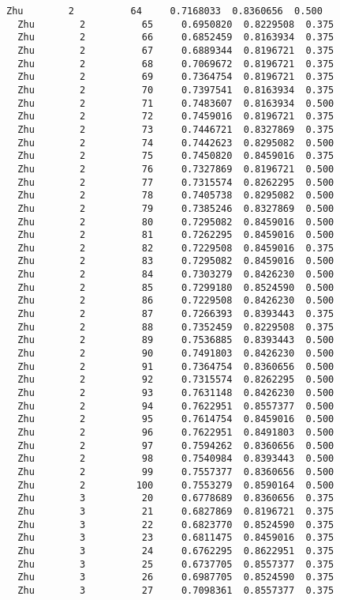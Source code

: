 \documentclass[11pt]{article}
\begin{document}
\begin{Verbatim}[commandchars=\\\{\}]
  Zhu        2          64     0.7168033  0.8360656  0.500
  Zhu        2          65     0.6950820  0.8229508  0.375
  Zhu        2          66     0.6852459  0.8163934  0.375
  Zhu        2          67     0.6889344  0.8196721  0.375
  Zhu        2          68     0.7069672  0.8196721  0.375
  Zhu        2          69     0.7364754  0.8196721  0.375
  Zhu        2          70     0.7397541  0.8163934  0.375
  Zhu        2          71     0.7483607  0.8163934  0.500
  Zhu        2          72     0.7459016  0.8196721  0.375
  Zhu        2          73     0.7446721  0.8327869  0.375
  Zhu        2          74     0.7442623  0.8295082  0.500
  Zhu        2          75     0.7450820  0.8459016  0.375
  Zhu        2          76     0.7327869  0.8196721  0.500
  Zhu        2          77     0.7315574  0.8262295  0.500
  Zhu        2          78     0.7405738  0.8295082  0.500
  Zhu        2          79     0.7385246  0.8327869  0.500
  Zhu        2          80     0.7295082  0.8459016  0.500
  Zhu        2          81     0.7262295  0.8459016  0.500
  Zhu        2          82     0.7229508  0.8459016  0.375
  Zhu        2          83     0.7295082  0.8459016  0.500
  Zhu        2          84     0.7303279  0.8426230  0.500
  Zhu        2          85     0.7299180  0.8524590  0.500
  Zhu        2          86     0.7229508  0.8426230  0.500
  Zhu        2          87     0.7266393  0.8393443  0.375
  Zhu        2          88     0.7352459  0.8229508  0.375
  Zhu        2          89     0.7536885  0.8393443  0.500
  Zhu        2          90     0.7491803  0.8426230  0.500
  Zhu        2          91     0.7364754  0.8360656  0.500
  Zhu        2          92     0.7315574  0.8262295  0.500
  Zhu        2          93     0.7631148  0.8426230  0.500
  Zhu        2          94     0.7622951  0.8557377  0.500
  Zhu        2          95     0.7614754  0.8459016  0.500
  Zhu        2          96     0.7622951  0.8491803  0.500
  Zhu        2          97     0.7594262  0.8360656  0.500
  Zhu        2          98     0.7540984  0.8393443  0.500
  Zhu        2          99     0.7557377  0.8360656  0.500
  Zhu        2         100     0.7553279  0.8590164  0.500
  Zhu        3          20     0.6778689  0.8360656  0.375
  Zhu        3          21     0.6827869  0.8196721  0.375
  Zhu        3          22     0.6823770  0.8524590  0.375
  Zhu        3          23     0.6811475  0.8459016  0.375
  Zhu        3          24     0.6762295  0.8622951  0.375
  Zhu        3          25     0.6737705  0.8557377  0.375
  Zhu        3          26     0.6987705  0.8524590  0.375
  Zhu        3          27     0.7098361  0.8557377  0.375

\end{Verbatim}
\end{document}
